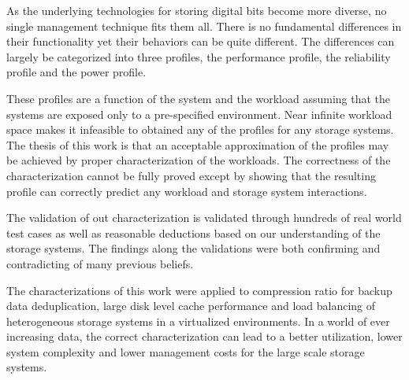 
As the underlying technologies for storing digital bits become more diverse, no single management technique fits them all. 
There is no fundamental differences in their functionality yet their behaviors can be quite different.
The differences can largely be categorized into three profiles, the performance profile, the reliability profile and the power profile.  

These profiles are a function of the system and the workload assuming that the systems are exposed only to a pre-specified environment. 
Near infinite workload space makes it infeasible to obtained any of the profiles for any storage systems. 
The thesis of this work is that an acceptable approximation of the profiles may be achieved by proper characterization of the workloads. 
The correctness of the characterization cannot be fully proved except by showing that the resulting profile can correctly predict any workload and storage system interactions. 

The validation of out characterization is validated through hundreds of real world test cases as well as reasonable deductions based on our understanding of the storage systems. 
The findings along the validations were both confirming and contradicting of many previous beliefs. 

The characterizations of this work were applied to compression ratio for backup data deduplication, large disk level cache performance and load balancing of heterogeneous storage systems in a virtualized environments. 
In a world of ever increasing data, the correct characterization can lead to a better utilization, lower system complexity and lower management costs for the large scale storage systems. 

